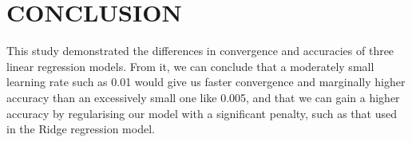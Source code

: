 \documentclass[letterpaper, 10 pt, conference]{ieeeconf}  %
\begin{document}
\section{CONCLUSION}
This study demonstrated the differences in convergence and accuracies of three linear regression models. From it, we can conclude that a moderately small learning rate such as 0.01 would give us faster convergence and marginally higher accuracy than an excessively small one like 0.005, and that we can gain a higher accuracy by regularising our model with a significant penalty, such as that used in the Ridge regression model.
\end{document}

